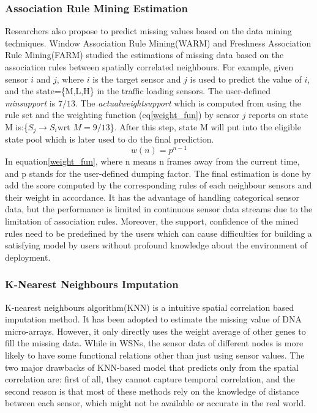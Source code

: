 \subsubsection{Association Rule Mining Estimation}
 Researchers also propose to predict missing values based on the data mining techniques. Window Association Rule Mining(WARM)\cite{le2005estimating} and Freshness Association Rule Mining(FARM)\cite{Gruenwald:FARM} studied the estimations of missing data based on the association rules between spatially correlated neighbours. For example, given sensor $i$ and $j$, where $i$ is the target sensor and $j$ is used to predict the value of $i$, and the state=\{M,L,H\} in the traffic loading sensors. The user-defined \textit{minsupport} is $7/13$. The \textit{actualweightsupport} which is computed from using the rule set and the weighting function (eq\ref{weight_fun}) by sensor $j$ reports on state M is:\{$S_{j} \rightarrow S_{i} \mbox{wrt }  M = 9/13$\}. After  this step, state M will put into the eligible state pool which is later used to do the final prediction. 
 \begin{equation}
 w(n) = p^{n-1}
 \label{weight_fun}
\end{equation}
In equation\ref{weight_fun},  where n means n frames away from the current time, and p stands for the user-defined dumping factor. The final estimation is done by add the score computed by the corresponding rules of each neighbour sensors and their weight in accordance.
 It has the advantage of handling categorical sensor data, but the performance is limited in continuous sensor data streams due to the limitation of association rules. Moreover, the support, confidence of the mined rules need to be predefined by the users which can cause difficulties for building a satisfying model by users without profound knowledge about the environment of deployment. 
\subsubsection{K-Nearest Neighbours Imputation} 
 K-nearest neighbours algorithm(KNN) is a intuitive spatial correlation based imputation method. It has been adopted to estimate the missing value of DNA micro-arrays\cite{Troyanskaya:DNAKNN}. However, it only directly uses the weight average of other genes to fill the missing data. While in WSNs, the sensor data of different nodes is more likely to have some functional relations other than just using sensor values. The two major drawbacks of KNN-based model that predicts only from the spatial correlation are: first of all,  they cannot capture temporal correlation, and the second reason is that most of these methods rely on the knowledge of distance between each sensor, which might not be available or accurate in the real world.
